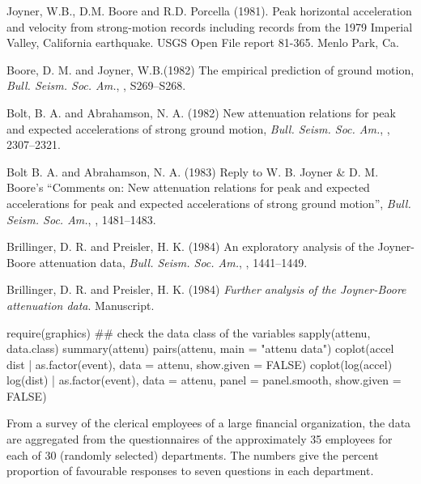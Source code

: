 %
\begin{Source}\relax
Joyner, W.B., D.M. Boore and R.D. Porcella (1981).  Peak horizontal
acceleration and velocity from strong-motion records including
records from the 1979 Imperial Valley, California earthquake.  USGS
Open File report 81-365. Menlo Park, Ca.
\end{Source}
%
\begin{References}\relax
Boore, D. M. and Joyner, W.B.(1982)
The empirical prediction of ground motion,
\emph{Bull. Seism. Soc. Am.}, , S269--S268.

Bolt, B. A. and Abrahamson, N. A. (1982)
New attenuation relations for peak and expected accelerations of
strong ground motion,
\emph{Bull. Seism. Soc. Am.}, , 2307--2321.

Bolt B. A. and Abrahamson, N. A. (1983)
Reply to W. B. Joyner \& D. M. Boore's ``Comments on: New
attenuation relations for peak and expected accelerations for peak
and expected accelerations of strong ground motion'',
\emph{Bull. Seism. Soc. Am.}, , 1481--1483. 

Brillinger, D. R. and Preisler, H. K. (1984)
An exploratory analysis of the Joyner-Boore attenuation data,
\emph{Bull. Seism. Soc. Am.}, , 1441--1449.

Brillinger, D. R. and Preisler, H. K. (1984)
\emph{Further analysis of the Joyner-Boore attenuation data}.
Manuscript.
\end{References}
%
\begin{Examples}
\begin{ExampleCode}
require(graphics)
## check the data class of the variables
sapply(attenu, data.class)
summary(attenu)
pairs(attenu, main = "attenu data")
coplot(accel ~ dist | as.factor(event), data = attenu, show.given = FALSE)
coplot(log(accel) ~ log(dist) | as.factor(event),
       data = attenu, panel = panel.smooth, show.given = FALSE)
\end{ExampleCode}
\end{Examples}
%
\begin{Description}\relax
From a survey of the clerical employees of a large financial
organization, the data are aggregated from the questionnaires of the
approximately 35 employees for each of 30 (randomly selected)
departments.  The numbers give the percent proportion of favourable
responses to seven questions in each department.
\end{Description}
%
